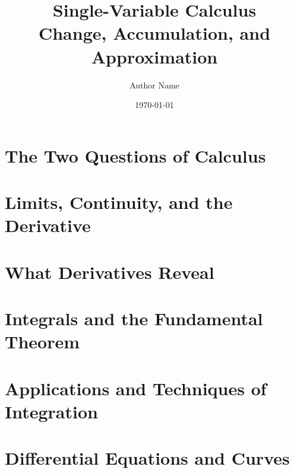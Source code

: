 \documentclass[11pt,letterpaper,openright,twoside]{book}
\title{Single-Variable Calculus\\\Large Change, Accumulation, and Approximation}
\author{Author Name}
\date{\today}
\begin{document}

\frontmatter



\tableofcontents




\mainmatter

\part{The Two Questions of Calculus}



\part{Limits, Continuity, and the Derivative}




\part{What Derivatives Reveal}



\part{Integrals and the Fundamental Theorem}



\part{Applications and Techniques of Integration}




\part{Differential Equations and Curves}


\end{document}
